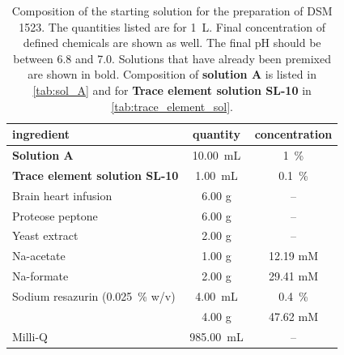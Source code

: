 

\begin{table}[ht]
	\centering
	\caption[Composition of the starting solution for the preparation of DSM 1523.]{Composition of the starting solution for the preparation of DSM 1523. The quantities listed are for 1~L. Final concentration of defined chemicals are shown as well. The final pH should be between 6.8 and 7.0. Solutions that have already been premixed are shown in bold. Composition of \textbf{solution A} is listed in \cref{tab:sol_A} and for \textbf{Trace element solution SL-10} in \cref{tab:trace_element_sol}.}
	\label{tab:DSM_1523}
	\begin{tabular}{lcc}
		\toprule
		ingredient & quantity & concentration \\
		\midrule
		\textbf{Solution A} & 10.00~mL & 1~\% \\
		\textbf{Trace element solution SL-10} & 1.00~mL & 0.1~\% \\
		Brain heart infusion & 6.00 g & -- \\
		Proteose peptone & 6.00 g & --\\
		Yeast extract & 2.00 g & --\\
		Na-acetate & 1.00 g & 12.19 mM \\
		Na-formate & 2.00 g & 29.41 mM \\
		Sodium resazurin (0.025~\% w/v) & 4.00~mL & 0.4~\% \\
		\ch{NaHCO3} & 4.00 g & 47.62 mM \\
		Milli-Q \ch{H2O} & 985.00~mL & -- \\
		\bottomrule
		
	\end{tabular}
\end{table}